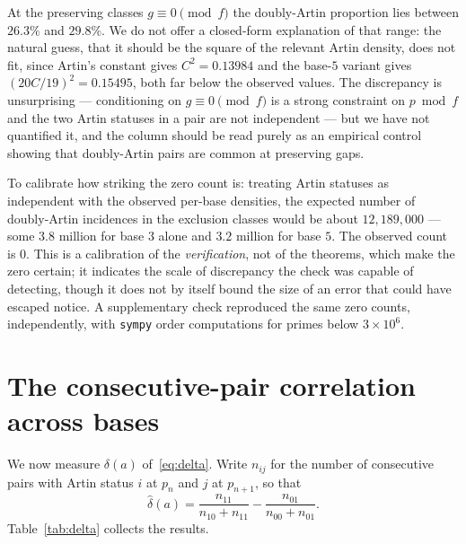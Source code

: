 \documentclass[11pt,reqno]{amsart}
\theoremstyle{plain}
\theoremstyle{definition}
\begin{document}
At the preserving classes $g \equiv 0 \pmod f$ the doubly-Artin proportion
lies between $26.3\%$ and $29.8\%$. We do not offer a closed-form explanation
of that range: the natural guess, that it should be the square of the relevant
Artin density, does not fit, since Artin's constant gives $C^2 = 0.13984$ and
the base-$5$ variant gives $(20C/19)^2 = 0.15495$, both far below the observed
values. The discrepancy is unsurprising --- conditioning on $g \equiv 0 \pmod
f$ is a strong constraint on $p \bmod f$ and the two Artin statuses in a pair
are not independent --- but we have not quantified it, and the column should
be read purely as an empirical control showing that doubly-Artin pairs are
common at preserving gaps.

To calibrate how striking the zero count is: treating Artin statuses as
independent with the observed per-base densities, the expected number of
doubly-Artin incidences in the exclusion classes would be about
$12{,}189{,}000$ --- some $3.8$ million for base $3$ alone and $3.2$ million
for base $5$. The observed count is $0$. This is a calibration of the
\emph{verification}, not of the theorems, which make the zero certain; it
indicates the scale of discrepancy the check was capable of detecting, though
it does not by itself bound the size of an error that could have escaped
notice. A supplementary check reproduced the same zero counts, independently,
with \texttt{sympy} order computations for primes below $3 \times 10^6$.

\section{The consecutive-pair correlation across bases}
\label{sec:delta}

We now measure $\delta(a)$ of~\eqref{eq:delta}. Write $n_{ij}$ for the number
of consecutive pairs with Artin status $i$ at $p_n$ and $j$ at $p_{n+1}$, so
that
\[
  \widehat{\delta}(a) = \frac{n_{11}}{n_{10}+n_{11}} - \frac{n_{01}}{n_{00}+n_{01}}.
\]
Table~\ref{tab:delta} collects the results.
\end{document}

